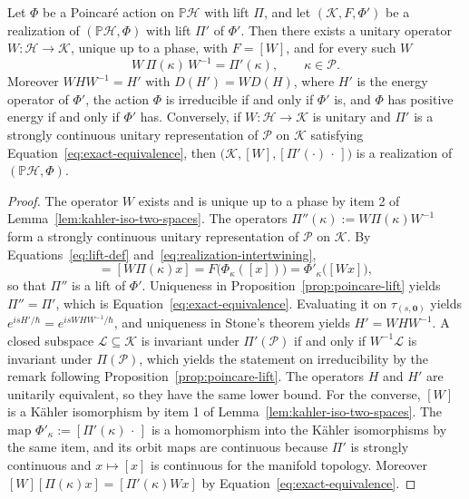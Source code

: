 \begin{proposition}\label{prop:realization-equivalence}
	Let $\Phi$ be a Poincar\'e action on $\mathbb{P}\mathcal{H}$ with lift $\Pi$, and let $(\mathcal{K},F,\Phi')$ be a realization of $(\mathbb{P}\mathcal{H},\Phi)$ with lift $\Pi'$ of $\Phi'$. Then there exists a unitary operator $W:\mathcal{H}\to\mathcal{K}$, unique up to a phase, with $F=[W]$, and for every such $W$
	\begin{equation}\label{eq:exact-equivalence}
		W\,\Pi(\kappa)\,W^{-1}=\Pi'(\kappa),\qquad \kappa\in\mathcal{P}.
	\end{equation}
	Moreover $W H W^{-1}=H'$ with $D(H')=W D(H)$, where $H'$ is the energy operator of $\Phi'$, the action $\Phi$ is irreducible if and only if $\Phi'$ is, and $\Phi$ has positive energy if and only if $\Phi'$ has. Conversely, if $W:\mathcal{H}\to\mathcal{K}$ is unitary and $\Pi'$ is a strongly continuous unitary representation of $\mathcal{P}$ on $\mathcal{K}$ satisfying Equation~\eqref{eq:exact-equivalence}, then $\big(\mathcal{K},[W],[\Pi'(\cdot)\,\cdot\,]\big)$ is a realization of $(\mathbb{P}\mathcal{H},\Phi)$.
\end{proposition}

\begin{proof}
	The operator $W$ exists and is unique up to a phase by item 2 of Lemma~\ref{lem:kahler-iso-two-spaces}. The operators $\Pi''(\kappa):=W\Pi(\kappa)W^{-1}$ form a strongly continuous unitary representation of $\mathcal{P}$ on $\mathcal{K}$. By Equations~\eqref{eq:lift-def} and~\eqref{eq:realization-intertwining},
	\begin{equation*}
		[\Pi''(\kappa)Wx]=[W\Pi(\kappa)x]=F\big(\Phi_\kappa([x])\big)=\Phi'_\kappa\big([Wx]\big),
	\end{equation*}
	so that $\Pi''$ is a lift of $\Phi'$. Uniqueness in Proposition~\ref{prop:poincare-lift} yields $\Pi''=\Pi'$, which is Equation~\eqref{eq:exact-equivalence}. Evaluating it on $\tau_{(s,\mathbf{0})}$ yields $e^{isH'/\hbar}=e^{isWHW^{-1}/\hbar}$, and uniqueness in Stone's theorem yields $H'=WHW^{-1}$. A closed subspace $\mathcal{L}\subseteq\mathcal{K}$ is invariant under $\Pi'(\mathcal{P})$ if and only if $W^{-1}\mathcal{L}$ is invariant under $\Pi(\mathcal{P})$, which yields the statement on irreducibility by the remark following Proposition~\ref{prop:poincare-lift}. The operators $H$ and $H'$ are unitarily equivalent, so they have the same lower bound. For the converse, $[W]$ is a Kähler isomorphism by item 1 of Lemma~\ref{lem:kahler-iso-two-spaces}. The map $\Phi'_\kappa:=[\Pi'(\kappa)\,\cdot\,]$ is a homomorphism into the Kähler isomorphisms by the same item, and its orbit maps are continuous because $\Pi'$ is strongly continuous and $x\mapsto[x]$ is continuous for the manifold topology. Moreover $[W][\Pi(\kappa)x]=[\Pi'(\kappa)Wx]$ by Equation~\eqref{eq:exact-equivalence}.
\end{proof}

